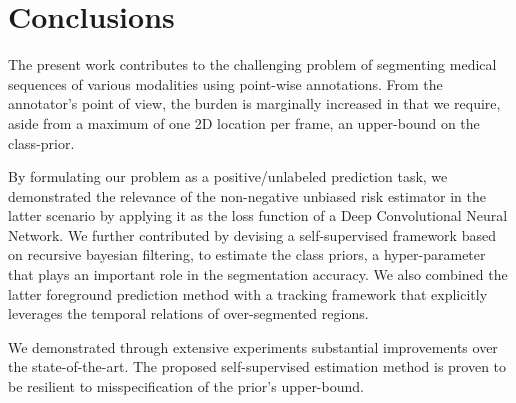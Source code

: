 \section{Conclusions}
\label{sec:conclusion}

The present work contributes to the challenging problem of segmenting medical sequences of various modalities using
point-wise annotations.
From the annotator's point of view, the burden is marginally increased in that we require, aside from a maximum of one 2D location per frame, an upper-bound on the class-prior.

By formulating our problem as a positive/unlabeled prediction task, we demonstrated the relevance of the non-negative unbiased risk estimator in the latter scenario by applying it as the loss function of a Deep Convolutional Neural Network.
We further contributed by devising a self-supervised framework based on recursive bayesian filtering, to estimate the class priors, a hyper-parameter that plays an important role in the segmentation accuracy.
We also combined the latter foreground prediction method with a tracking framework that explicitly leverages the temporal relations of over-segmented regions.

We demonstrated through extensive experiments substantial improvements over the state-of-the-art.
The proposed self-supervised estimation method is proven to be resilient to misspecification of the prior's upper-bound.


